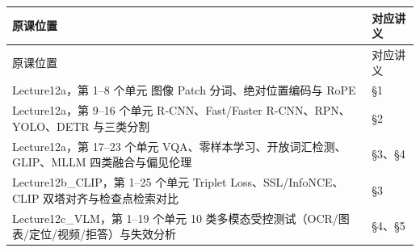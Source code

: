 \begingroup\small\setlength{\tabcolsep}{3pt}\renewcommand{\arraystretch}{1.22}
\begin{longtable}{@{}>{\raggedright\arraybackslash}p{}>{\raggedright\arraybackslash}p{}@{}}
\toprule
原课位置 & 对应讲义 \\
\midrule\endfirsthead
原课位置 & 对应讲义 \\
\midrule\endhead
\bottomrule\endfoot
Lecture12a，第 1–8 个单元 图像 Patch 分词、绝对位置编码与 RoPE & §1 \\
Lecture12a，第 9–16 个单元 R-CNN、Fast/Faster R-CNN、RPN、YOLO、DETR 与三类分割 & §2 \\
Lecture12a，第 17–23 个单元 VQA、零样本学习、开放词汇检测、GLIP、MLLM 四类融合与偏见伦理 & §3、§4 \\
Lecture12b\_CLIP，第 1–25 个单元 Triplet Loss、SSL/InfoNCE、CLIP 双塔对齐与检查点检索对比 & §3 \\
Lecture12c\_VLM，第 1–19 个单元 10 类多模态受控测试（OCR/图表/定位/视频/拒答）与失效分析 & §4、§5 \\
\end{longtable}\endgroup
